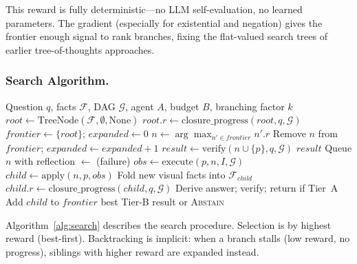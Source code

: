 \documentclass[runningheads]{llncs}
\begin{document}
\noindent
This reward is fully deterministic---no LLM self-evaluation, no learned
parameters.
The gradient (especially for existential and negation) gives the frontier
enough signal to rank branches, fixing the flat-valued search trees of
earlier tree-of-thoughts approaches.

\subsubsection{Search Algorithm.}

\begin{algorithm}[t]
\caption{Verifier-Guided Multimodal Tree Search}
\label{alg:search}
\begin{algorithmic}[1]
\REQUIRE Question $q$, facts $\mathcal{F}$, DAG $\mathcal{G}$, agent $A$,
  budget $B$, branching factor $k$
\STATE $\mathit{root} \gets \text{TreeNode}(\mathcal{F}, \emptyset, \text{None})$
\STATE $\mathit{root}.r \gets \text{closure\_progress}(\mathit{root}, q, \mathcal{G})$
\STATE $\mathit{frontier} \gets \{\mathit{root}\}$;\quad
       $\mathit{expanded} \gets 0$
  \STATE $n \gets \arg\max_{n' \in \mathit{frontier}} n'.r$
  \STATE Remove $n$ from $\mathit{frontier}$;
         $\mathit{expanded} \gets \mathit{expanded} + 1$
      \STATE $\mathit{result} \gets \text{verify}(n \cup \{p\}, q, \mathcal{G})$
        \RETURN $\mathit{result}$
      \ENDIF
        \STATE Queue $n$ with reflection $\gets$ (failure)
        \hfill{}
      \ENDIF
    \ELSE
      \STATE $\mathit{obs} \gets \text{execute}(p, n, I, \mathcal{G})$
      \STATE $\mathit{child} \gets \text{apply}(n, p, \mathit{obs})$
      \STATE Fold new visual facts into $\mathcal{F}_{\mathit{child}}$
      \STATE $\mathit{child}.r \gets
             \text{closure\_progress}(\mathit{child}, q, \mathcal{G})$
        \STATE Derive answer; verify; return if Tier~A
      \ENDIF
        \STATE Add $\mathit{child}$ to $\mathit{frontier}$
      \ENDIF
    \ENDIF
  \ENDFOR
\ENDWHILE
\RETURN best Tier-B result or \textsc{Abstain}
\end{algorithmic}
\end{algorithm}

Algorithm~\ref{alg:search} describes the search procedure.
Selection is by highest reward (best-first).
Backtracking is implicit: when a branch stalls (low reward, no progress),
siblings with higher reward are expanded instead.
\end{document}
